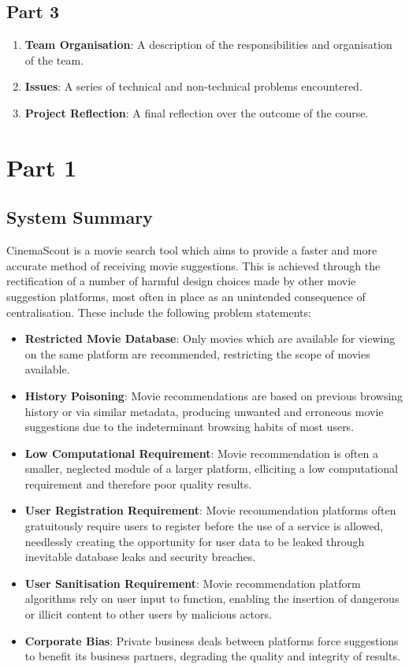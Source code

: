 \documentclass{article}
\begin{document}
\subsection*{Part 3}
\begin{enumerate}
\item \textbf{Team Organisation}: A description of the responsibilities and
organisation of the team.
\item \textbf{Issues}: A series of technical and non-technical problems
encountered.
\item \textbf{Project Reflection}: A final reflection over the outcome of the
course.
\end{enumerate}

\section{Part 1}
\subsection{System Summary}
CinemaScout is a movie search tool which aims to provide a faster and more
accurate method of receiving movie suggestions. This is achieved 
through the rectification of a number of harmful design choices made by other 
movie suggestion platforms, most often in place as an unintended consequence 
of centralisation. These include the following problem statements:
\begin{itemize}
\item \textbf{Restricted Movie Database}: Only movies which are available for
viewing on the same platform are recommended, restricting the scope of movies
available.
\item \textbf{History Poisoning}: Movie recommendations are based on previous
browsing history or via similar metadata, producing unwanted and erroneous
movie suggestions due to the indeterminant browsing habits of most users.
\item \textbf{Low Computational Requirement}: Movie recommendation is often a
smaller, neglected module of a larger platform, elliciting a low computational 
requirement and therefore poor quality results.
\item \textbf{User Registration Requirement}: Movie recommendation platforms
often gratuitously require users to register before the use of a service is
allowed, needlessly creating the opportunity for user data to be leaked through
inevitable database leaks and security breaches.
\item \textbf{User Sanitisation Requirement}: Movie recommendation platform
algorithms rely on user input to function, enabling the insertion of dangerous
or illicit content to other users by malicious actors.
\item \textbf{Corporate Bias}: Private business deals between platforms force
suggestions to benefit its business partners, degrading the quality and
integrity of results.
\end{itemize}
\end{document}
